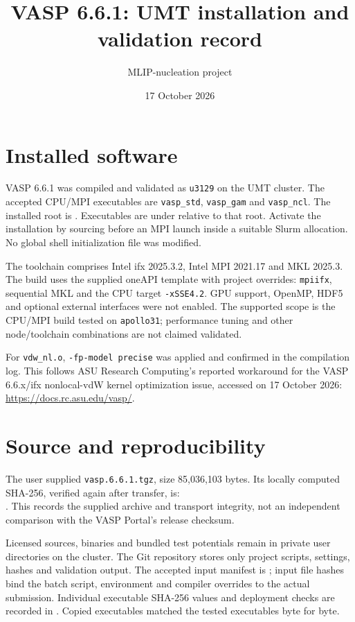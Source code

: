 \documentclass[10pt,a4paper]{article}
\title{VASP 6.6.1: UMT installation and validation record}
\author{MLIP-nucleation project}
\date{17 October 2026}
\begin{document}
\maketitle

\section{Installed software}
VASP 6.6.1 was compiled and validated as \texttt{u3129} on the UMT cluster.
The accepted CPU/MPI executables are \texttt{vasp\_std}, \texttt{vasp\_gam}
and \texttt{vasp\_ncl}. The installed root is
.
Executables are under  relative to that root.
Activate the installation by sourcing  before an MPI launch
inside a suitable Slurm allocation. No global shell initialization file was modified.

The toolchain comprises Intel ifx 2025.3.2, Intel MPI 2021.17 and MKL 2025.3.
The build uses the supplied oneAPI template with project overrides:
\texttt{mpiifx}, sequential MKL and the CPU target \texttt{-xSSE4.2}.
GPU support, OpenMP, HDF5 and optional external interfaces were not enabled.
The supported scope is the CPU/MPI build tested on \texttt{apollo31};
performance tuning and other node/toolchain combinations are not claimed validated.

For \texttt{vdw\_nl.o}, \texttt{-fp-model precise} was applied and confirmed
in the compilation log. This follows ASU Research Computing's reported workaround
for the VASP 6.6.x/ifx nonlocal-vdW kernel optimization issue, accessed on
17 October 2026:\\
\url{https://docs.rc.asu.edu/vasp/}.

\section{Source and reproducibility}
The user supplied \texttt{vasp.6.6.1.tgz}, size 85,036,103 bytes.
Its locally computed SHA-256, verified again after transfer, is:\\
.
This records the supplied archive and transport integrity, not an independent
comparison with the VASP Portal's release checksum.

Licensed sources, binaries and bundled test potentials remain in private
user directories on the cluster. The Git repository stores only project scripts,
settings, hashes and validation output. The accepted input manifest is
; input file hashes bind the
batch script, environment and compiler overrides to the actual submission.
Individual executable SHA-256 values and deployment checks are recorded in
.
Copied executables matched the tested executables byte for byte.
\end{document}
